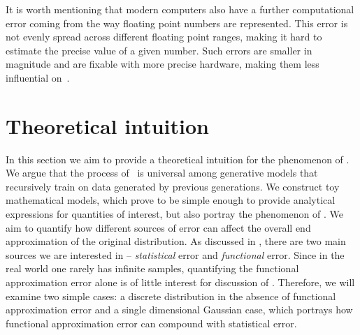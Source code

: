 It is worth mentioning that modern computers also have a further computational error coming from the way floating point numbers are represented. This error is not evenly spread across different floating point ranges, making it hard to estimate the precise value of a given number. Such errors are smaller in magnitude and are fixable with more precise hardware, making them less influential on~\md.







\section{Theoretical intuition}
\label{sec:theoreticalint}

In this section we aim to provide a theoretical intuition for the phenomenon of \md. We argue that the process of \md~is universal among generative models that recursively train on data generated by previous generations. We construct toy mathematical models, which prove to be simple enough to provide analytical expressions for quantities of interest, but also portray the phenomenon of \md. We aim to quantify how different sources of error can affect the overall end approximation of the original distribution. As discussed in , there are two main sources we are interested in -- \textit{statistical} error and \textit{functional} error. Since in the real world one rarely has infinite samples, quantifying the functional approximation error alone is of little interest for discussion of \md. Therefore, we will examine two simple cases: a discrete distribution in the absence of functional approximation error and a single dimensional Gaussian case, which portrays how functional approximation error can compound with statistical error. 

